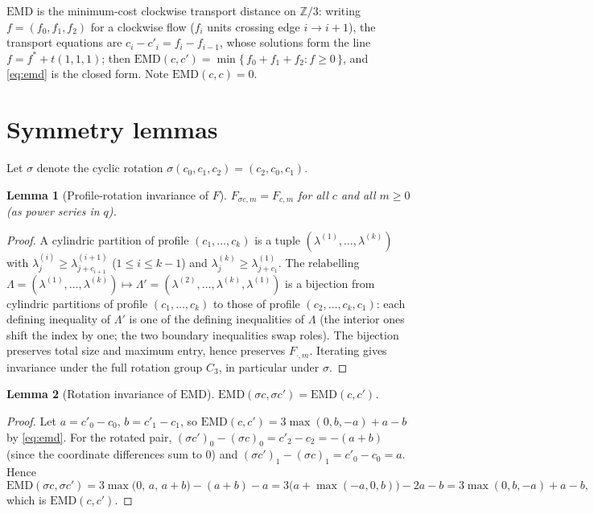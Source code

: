 \documentclass[11pt]{article}
\newtheorem{lemma}{Lemma}
\newcommand{\EMD}{\mathrm{EMD}}
\begin{document}
\noindent $\EMD$ is the minimum-cost clockwise transport distance on $\mathbb{Z}/3$:
writing $f=(f_0,f_1,f_2)$ for a clockwise flow ($f_i$ units crossing edge $i\to i+1$),
the transport equations are $c_i - c'_i = f_i - f_{i-1}$, whose solutions form the line
$f = f^\ast + t(1,1,1)$; then $\EMD(c,c') = \min\{\,f_0+f_1+f_2 : f\ge 0\,\}$, and
\eqref{eq:emd} is the closed form. Note $\EMD(c,c)=0$.

\section{Symmetry lemmas}

Let $\sigma$ denote the cyclic rotation $\sigma(c_0,c_1,c_2)=(c_2,c_0,c_1)$.

\begin{lemma}[Profile-rotation invariance of $F$]\label{lem:Finv}
$F_{\sigma c, m} = F_{c,m}$ for all $c$ and all $m\ge 0$ (as power series in $q$).
\end{lemma}

\begin{proof}
A cylindric partition of profile $(c_1,\dots,c_k)$ is a tuple $(\lambda^{(1)},\dots,\lambda^{(k)})$
with $\lambda^{(i)}_j \ge \lambda^{(i+1)}_{j+c_{i+1}}$ ($1\le i\le k-1$) and
$\lambda^{(k)}_j \ge \lambda^{(1)}_{j+c_1}$. The relabelling
$\Lambda=(\lambda^{(1)},\dots,\lambda^{(k)})\mapsto
\Lambda'=(\lambda^{(2)},\dots,\lambda^{(k)},\lambda^{(1)})$
is a bijection from cylindric partitions of profile $(c_1,\dots,c_k)$ to those of profile
$(c_2,\dots,c_k,c_1)$: each defining inequality of $\Lambda'$ is one of the defining
inequalities of $\Lambda$ (the interior ones shift the index by one; the two boundary
inequalities swap roles). The bijection preserves total size and maximum entry, hence
preserves $F_{\cdot,m}$. Iterating gives invariance under the full rotation group $C_3$,
in particular under $\sigma$.
\end{proof}

\begin{lemma}[Rotation invariance of $\EMD$]\label{lem:emdinv}
$\EMD(\sigma c, \sigma c') = \EMD(c,c')$.
\end{lemma}

\begin{proof}
Let $a = c'_0-c_0$, $b = c'_1-c_1$, so $\EMD(c,c') = 3\max(0,b,-a)+a-b$ by \eqref{eq:emd}.
For the rotated pair, $(\sigma c')_0-(\sigma c)_0 = c'_2-c_2 = -(a+b)$ (since the coordinate
differences sum to $0$) and $(\sigma c')_1-(\sigma c)_1 = c'_0-c_0 = a$. Hence
\[
\EMD(\sigma c,\sigma c') = 3\max\bigl(0,\, a,\, a+b\bigr) - (a+b) - a
= 3\bigl(a + \max(-a, 0, b)\bigr) - 2a - b
= 3\max(0,b,-a) + a - b,
\]
which is $\EMD(c,c')$.
\end{proof}
\end{document}

